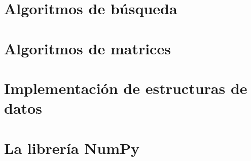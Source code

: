 \documentclass{article}
\begin{document}
\section{Algoritmos de búsqueda}

\section{Algoritmos de matrices}

\section{Implementación de estructuras de datos}

\section{La librería NumPy}
\end{document}

